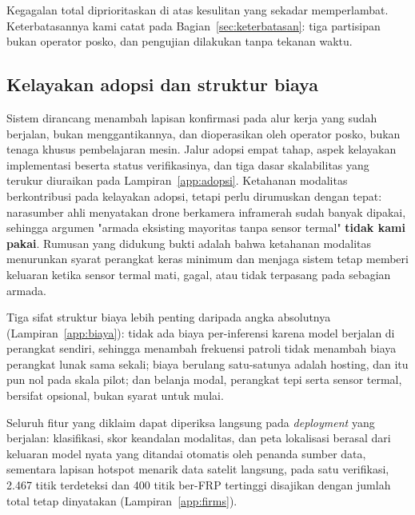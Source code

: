 Kegagalan total diprioritaskan di atas kesulitan yang sekadar memperlambat.
Keterbatasannya kami catat pada Bagian~\ref{sec:keterbatasan}: tiga partisipan
bukan operator posko, dan pengujian dilakukan tanpa tekanan waktu.


\subsection{Kelayakan adopsi dan struktur biaya}

Sistem dirancang menambah lapisan konfirmasi pada alur kerja yang sudah berjalan,
bukan menggantikannya, dan dioperasikan oleh operator posko, bukan tenaga khusus
pembelajaran mesin. Jalur adopsi empat tahap, aspek kelayakan implementasi
beserta status verifikasinya, dan tiga dasar skalabilitas yang terukur diuraikan
pada Lampiran~\ref{app:adopsi}. Ketahanan modalitas berkontribusi pada kelayakan adopsi,
tetapi perlu dirumuskan dengan tepat: narasumber ahli menyatakan drone berkamera
inframerah sudah banyak dipakai, sehingga argumen "armada eksisting mayoritas
tanpa sensor termal" \textbf{tidak kami pakai}. Rumusan yang didukung bukti
adalah bahwa ketahanan modalitas menurunkan syarat perangkat keras minimum dan
menjaga sistem tetap memberi keluaran ketika sensor termal mati, gagal, atau
tidak terpasang pada sebagian armada.

Tiga sifat struktur biaya lebih penting daripada angka absolutnya
(Lampiran~\ref{app:biaya}): tidak ada biaya per-inferensi karena model berjalan
di perangkat sendiri, sehingga menambah frekuensi patroli tidak menambah biaya
perangkat lunak sama sekali; biaya berulang satu-satunya adalah hosting, dan itu
pun nol pada skala pilot; dan belanja modal, perangkat tepi serta sensor
termal, bersifat opsional, bukan syarat untuk mulai.

Seluruh fitur yang diklaim dapat diperiksa langsung pada \emph{deployment} yang
berjalan: klasifikasi, skor keandalan modalitas, dan peta lokalisasi berasal dari
keluaran model nyata yang ditandai otomatis oleh penanda sumber data, sementara
lapisan hotspot menarik data satelit langsung, pada satu verifikasi, 2.467 titik
terdeteksi dan 400 titik ber-FRP tertinggi disajikan dengan jumlah total tetap
dinyatakan (Lampiran~\ref{app:firms}).
